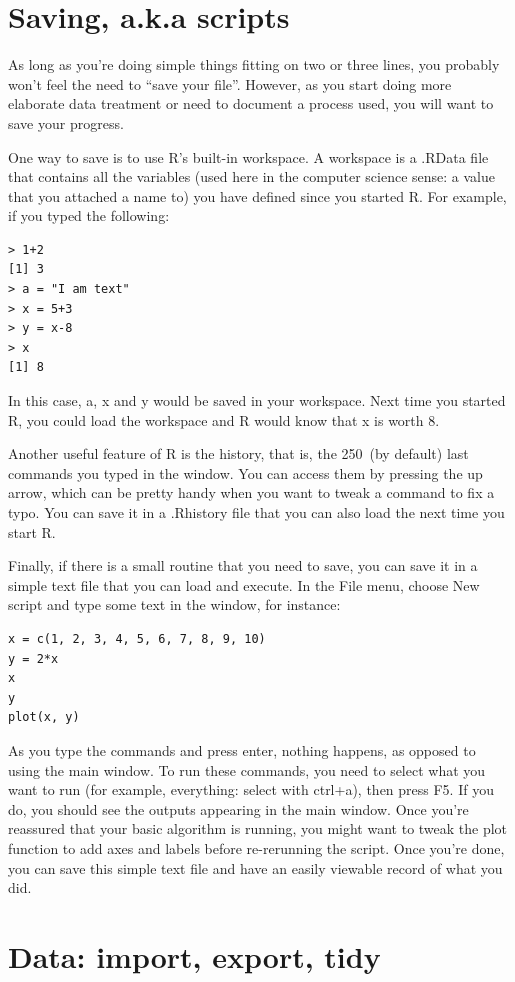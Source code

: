 \documentclass{report}
\newcommand{\code}[1]{\textsf{\ttfamily #1}}
\begin{document}
	\section{Saving, a.k.a scripts}
	As long as you're doing simple things fitting on two or three lines, you probably won't feel the need to ``save your file''. However, as you start doing more elaborate data treatment or need to document a process used, you will want to save your progress.
	
	One way to save is to use R's built-in \code{workspace}. A \code{workspace} is a \code{.RData} file that contains all the variables (used here in the computer science sense: a value that you attached a name to) you have defined since you started R. For example, if you typed the following:
	\begin{verbatim}
> 1+2
[1] 3
> a = "I am text"
> x = 5+3
> y = x-8
> x
[1] 8
	\end{verbatim}
	In this case, \code{a}, \code{x} and \code{y} would be saved in your workspace. Next time you started R, you could load the \code{workspace} and R would know that x is worth 8.
	
	Another useful feature of R is the history, that is, the 250~(by default) last commands you typed in the window. You can access them by pressing the up arrow, which can be pretty handy when you want to tweak a command to fix a typo. You can save it in a \code{.Rhistory} file that you can also load the next time you start R.
	
	Finally, if there is a small routine that you need to save, you can save it in a simple text file that you can load and execute. In the \code{File} menu, choose \code{New script} and type some text in the window, for instance:
	\begin{verbatim}
x = c(1, 2, 3, 4, 5, 6, 7, 8, 9, 10)
y = 2*x
x
y
plot(x, y)
	\end{verbatim}
	As you type the commands and press enter, nothing happens, as opposed to using the main window. To run these commands, you need to select what you want to run (for example, everything: select with ctrl+a), then press F5. If you do, you should see the outputs appearing in the main window. Once you're reassured that your basic algorithm is running, you might want to tweak the plot function to add axes and labels before re-rerunning the script. Once you're done, you can save this simple text file and have an easily viewable record of what you did.
	
	\section{Data: import, export, tidy}\label{sec:data-import}	
\end{document}
